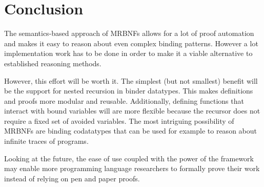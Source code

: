 \chapter{Conclusion}

The semantics-based approach of \acp{MRBNF} allows for a lot of proof automation and makes it easy to reason about even complex binding patterns. However a lot implementation work has to be done in order to make it a viable alternative to established reasoning methods.

However, this effort will be worth it. The simplest (but not smallest) benefit will be the support for nested recursion in binder datatypes. This makes definitions and proofs more modular and reusable. Additionally, defining functions that interact with bound variables will are more flexible because the recursor does not require a fixed set of avoided variables. The most intriguing possibility of \acp{MRBNF} are binding codatatypes that can be used for example to reason about infinite traces of programs.

Looking at the future, the ease of use coupled with the power of the framework may enable more programming language researchers to formally prove their work instead of relying on pen and paper proofs.
